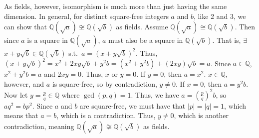 \documentclass[fleqn]{article}
\begin{document}
        As fields, however, isomorphism is much more than just having the same dimension.  In general, for distinct square-free integers $a$ and $b$, like 2 and 3, we can show that $\mathbb{Q}(\sqrt{a}) \not\cong \mathbb{Q}(\sqrt{b})$ as fields.  Assume $\mathbb{Q}(\sqrt{a}) \cong \mathbb{Q}(\sqrt{b})$.  Then since $a$ is a square in $\mathbb{Q}(\sqrt{a})$, $a$ must also be a square in $\mathbb{Q}(\sqrt{b})$.  That is, $\exists$ $x + y\sqrt{b} \in \mathbb{Q}(\sqrt{b})$ s.t.\ $a = (x + y\sqrt{b})^2$.  Thus, $(x + y\sqrt{b})^2 = x^2 + 2xy\sqrt{b} + y^2 b = (x^2 + y^2 b) + (2xy) \sqrt{b} = a$.  Since $a \in \mathbb{Q}$, $x^2 + y^2 b = a$ and $2xy = 0$.  Thus, $x$ or $y = 0$.  If $y = 0$, then $a = x^2$.  $x \in \mathbb{Q}$, however, and $a$ is square-free, so by contradiction, $y \neq 0$.  If $x = 0$, then $a = y^2 b$.  Now let $y = \frac{p}{q} \in \mathbb{Q}$ where $\gcd(p, q) = 1$.  Thus, we have $a = \left(\frac{p}{q}\right)^2 b$, so $aq^2 = bp^2$.  Since $a$ and $b$ are square-free, we must have that $|p| = |q| = 1$, which means that $a = b$, which is a contradiction.  Thus, $y \neq 0$, which is another contradiction, meaning $\mathbb{Q}(\sqrt{a}) \not\cong \mathbb{Q}(\sqrt{b})$ as fields.
    
\end{document}

